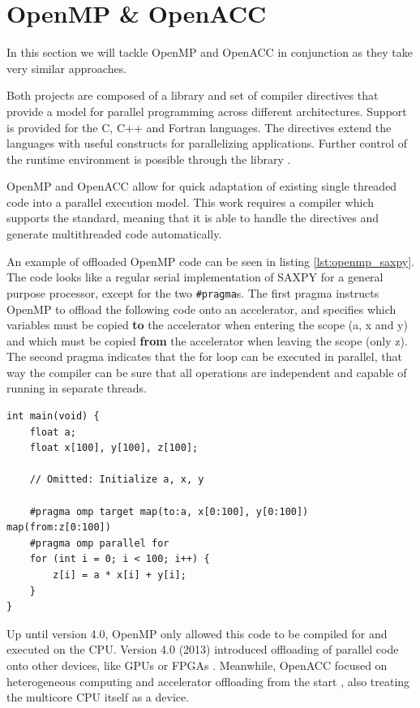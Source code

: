 \section{OpenMP \& OpenACC} \label{sect:openmp-openacc}
In this section we will tackle OpenMP and OpenACC in conjunction as they take very similar approaches.

Both projects are composed of a library and set of compiler directives that provide a model for parallel programming across different architectures. Support is provided for the C, C++ and Fortran languages. The directives extend the languages with useful constructs for parallelizing applications. Further control of the runtime environment is possible through the library \cite{openmp_spec, openacc_spec}.

OpenMP and OpenACC allow for quick adaptation of existing single threaded code into a parallel execution model. This work requires a compiler which supports the standard, meaning that it is able to handle the directives and generate multithreaded code automatically.

An example of offloaded OpenMP code can be seen in listing \ref{lst:openmp_saxpy}. The code looks like a regular serial implementation of SAXPY for a general purpose processor, except for the two \texttt{\#pragma}s. The first pragma instructs OpenMP to offload the following code onto an accelerator, and specifies which variables must be copied \textbf{to} the accelerator when entering the scope (a, x and y) and which must be copied \textbf{from} the accelerator when leaving the scope (only z). The second pragma indicates that the for loop can be executed in parallel, that way the compiler can be sure that all operations are independent and capable of running in separate threads.

\begin{lstlisting}[style=CStyle, caption=OpenMP saxpy example, float, floatplacement=H, label={lst:openmp_saxpy}]
int main(void) {
    float a;
    float x[100], y[100], z[100];

    // Omitted: Initialize a, x, y

    #pragma omp target map(to:a, x[0:100], y[0:100]) map(from:z[0:100])
    #pragma omp parallel for
    for (int i = 0; i < 100; i++) {
        z[i] = a * x[i] + y[i];
    }
}
\end{lstlisting}

Up until version 4.0, OpenMP only allowed this code to be compiled for and executed on the CPU. Version 4.0 (2013) introduced offloading of parallel code onto other devices, like GPUs or FPGAs \cite{openmp_gpu_support}. Meanwhile, OpenACC focused on heterogeneous computing and accelerator offloading from the start \cite{openacc_initial_spec}, also treating the multicore CPU itself as a device.

